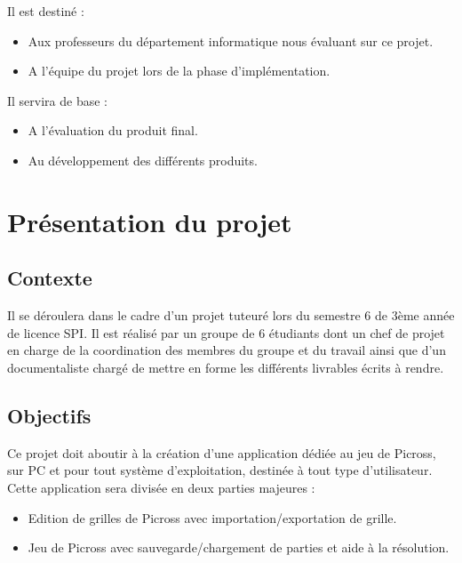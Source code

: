 \documentclass[a4paper, 12pt, twoside]{article}
\begin{document}
Il est destiné :

\begin{itemize}\setlength{\itemsep}{3mm}
 \item Aux professeurs du département informatique nous évaluant sur ce projet.
 \item A l'équipe du projet lors de la phase d'implémentation.
\end{itemize}

\smallbreak
Il servira de base :

\begin{itemize}\setlength{\itemsep}{3mm}
 \item A l'évaluation du produit final.
 \item Au développement des différents produits.
\end{itemize}

\section{Présentation du projet}

\subsection{Contexte}

Il se déroulera dans le cadre d’un projet tuteuré lors du semestre 6 de 3ème année de licence SPI.
\smallbreak
Il est réalisé par un groupe de 6 étudiants dont un chef de projet en charge de la coordination des membres du groupe et du travail ainsi que d’un documentaliste chargé de mettre en forme les différents livrables écrits à rendre.

\subsection{Objectifs}

Ce projet doit aboutir à la création d’une application dédiée au jeu de Picross, sur PC et pour tout système d’exploitation, destinée à tout type d’utilisateur.
\smallbreak
Cette application sera divisée en deux parties majeures :
\smallbreak
\begin{itemize}\setlength{\itemsep}{1mm}
 \item Edition de grilles de Picross avec importation/exportation de grille.
 \item Jeu de Picross avec sauvegarde/chargement de parties et aide à la résolution.
\end{itemize}
\end{document}
